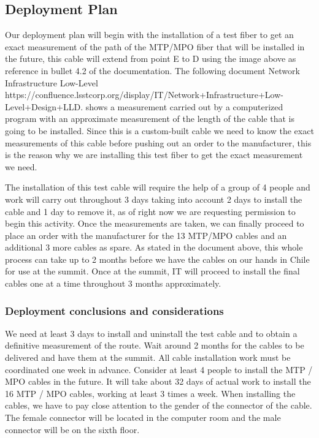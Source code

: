 \subsection{Deployment Plan}

  Our deployment plan will begin with the installation of a test fiber to get an exact measurement of the path of the MTP/MPO fiber that will be installed in the future, this cable will extend from point E to D using the image above as reference in bullet 4.2 of the documentation. The following document Network Infrastructure Low-Level https://confluence.lsstcorp.org/display/IT/Network+Infrastructure+Low-Level+Design+LLD. shows a measurement carried out by a computerized program with an approximate measurement of the length of the cable that is going to be installed. Since this is a custom-built cable we need to know the exact measurements of this cable before pushing out an order to the manufacturer, this is the reason why we are installing this test fiber to get the exact measurement we need. 


  The installation of this test cable will require the help of a group of 4 people and work will carry out throughout 3 days taking into account 2 days to install the cable and 1 day to remove it, as of right now we are requesting permission to begin this activity. Once the measurements are taken, we can finally proceed to place an order with the manufacturer for the 13 MTP/MPO cables and an additional 3 more cables as spare. As stated in the document above, this whole process can take up to 2 months before we have the cables on our hands in Chile for use at the summit. Once at the summit, IT will proceed to install the final cables one at a time throughout 3 months approximately.

\subsubsection{Deployment conclusions and considerations}

  We need at least 3 days to install and uninstall the test cable and to obtain a definitive measurement of the route.
  Wait around 2 months for the cables to be delivered and have them at the summit.
  All cable installation work must be coordinated one week in advance.
  Consider at least 4 people to install the MTP / MPO cables in the future.
  It will take about 32 days of actual work to install the 16 MTP / MPO cables, working at least 3 times a week.
  When installing the cables, we have to pay close attention to the gender of the connector of the cable.  The female connector will be located in the computer room and the male connector will be on the sixth floor.








